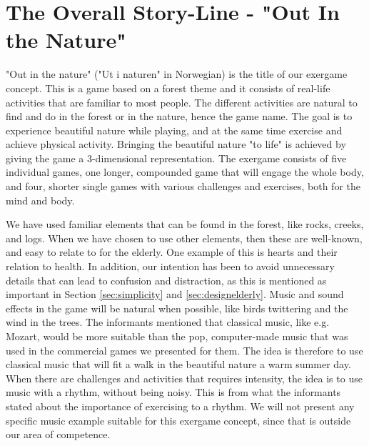 \section{The Overall Story-Line - "Out In the Nature"}
\label{sec:outinthenature}

"Out in the nature" ("Ut i naturen" in Norwegian) is the title of our exergame concept. This is a game based on a forest theme and it consists of real-life activities that are familiar to most people. The different activities are natural to find and do in the forest or in the nature, hence the game name. The goal is to experience beautiful nature while playing, and at the same time exercise and achieve physical activity. Bringing the beautiful nature "to life" is achieved by giving the game a 3-dimensional representation. The exergame consists of five individual games, one longer, compounded game that will engage the whole body, and four, shorter single games with various challenges and exercises, both for the mind and body.        

We have used familiar elements that can be found in the forest, like rocks, creeks, and logs. When we have chosen to use other elements, then these are well-known, and easy to relate to for the elderly. One example of this is hearts and their relation to health. In addition, our intention has been to avoid unnecessary details that can lead to confusion and distraction, as this is mentioned as important in Section \ref{sec:simplicity} and \ref{sec:designelderly}. Music and sound effects in the game will be natural when possible, like birds twittering and the wind in the trees. The informants mentioned that classical music, like e.g. Mozart, would be more suitable than the pop, computer-made music that was used in the commercial games we presented for them. The idea is therefore to use classical music that will fit a walk in the beautiful nature a warm summer day. When there are challenges and activities that requires intensity, the idea is to use music with a rhythm, without being noisy. This is from what the informants stated about the importance of exercising to a rhythm. We will not present any specific music example suitable for this exergame concept, since that is outside our area of competence. 

